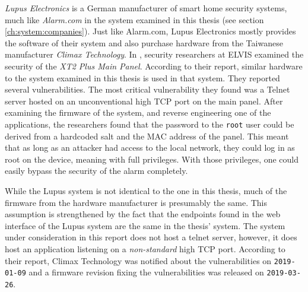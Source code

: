 \textit{Lupus Electronics} is a German manufacturer of smart home security systems, much like \textit{Alarm.com} in the system examined in this thesis (see section \ref{ch:system:companies}). Just like Alarm.com, Lupus Electronics mostly provides the software of their system and also purchase hardware from the Taiwanese manufacturer \textit{Climax Technology}. In \citeyear{labvienna}, security researchers at ELVIS examined the security of the \textit{XT2 Plus Main Panel}. According to their report, similar hardware to the system examined in this thesis is used in that system. They reported several vulnerabilities. The most critical vulnerability they found was a Telnet server hosted on an unconventional high TCP port on the main panel. After examining the firmware of the system, and reverse engineering one of the applications, the researchers found that the password to the \texttt{root} user could be derived from a hardcoded salt and the MAC address of the panel. This meant that as long as an attacker had access to the local network, they could log in as root on the device, meaning with full privileges. With those privileges, one could easily bypass the security of the alarm completely.

While the Lupus system is not identical to the one in this thesis, much of the firmware from the hardware manufacturer is presumably the same. This assumption is strengthened by the fact that the endpoints found in the web interface of the Lupus system are the same in the thesis' system. The system under consideration in this report does not host a telnet server, however, it does host an application listening on a \textit{non-standard} high TCP port. According to their report, Climax Technology was notified about the vulnerabilities on \texttt{2019-01-09} and a firmware revision fixing the vulnerabilities was released on \texttt{2019-03-26}.

